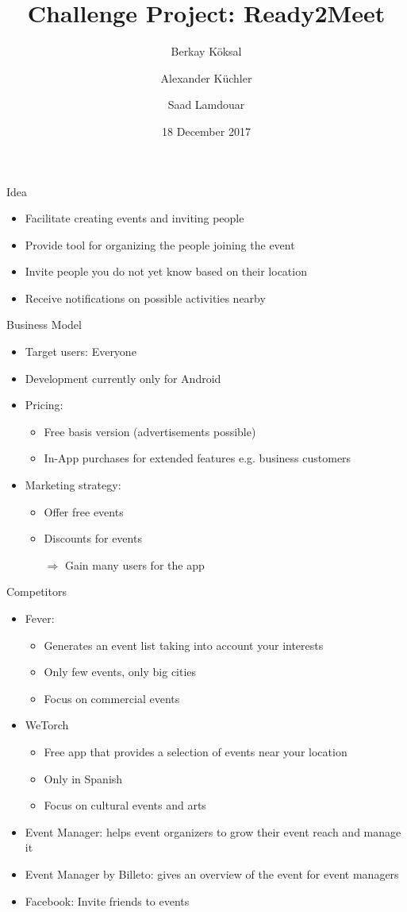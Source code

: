 \documentclass[logo=EURECOM,english]{eurecombeamer}
\date{18 December 2017}
\title{Challenge Project: Ready2Meet}
\author{Berkay K\"oksal \and Alexander K\"uchler \and Saad Lamdouar}
\institute{\EURECOMname}
\begin{document}
\maketitleframeEURECOM

\begin{frame}{Idea}
\begin{itemize}
\item Facilitate creating events and inviting people
\item Provide tool for organizing the people joining the event
\item Invite people you do not yet know based on their location
\item Receive notifications on possible activities nearby
\end{itemize}
\end{frame}

\begin{frame}{Business Model}
\begin{itemize}
\item Target users: Everyone
\item Development currently only for Android
\item Pricing:
	\begin{itemize}
	\item Free basis version (advertisements possible)
	\item In-App purchases for extended features e.g. business customers
	\end{itemize}
\item Marketing strategy:
	\begin{itemize}
	\item Offer free events
	\item Discounts for events
	\item[$\Rightarrow$] Gain many users for the app
	\end{itemize}
\end{itemize}
\end{frame}

\begin{frame}{Competitors}
\begin{itemize}
\item Fever:
	\begin{itemize}
	\item Generates an event list taking into account your interests
	\item Only few events, only big cities
	\item Focus on commercial events
	\end{itemize}
\item WeTorch
	\begin{itemize}
	\item Free app that provides a selection of events near your location
	\item Only in Spanish
	\item Focus on cultural events and arts
	\end{itemize}
\item Event Manager: helps event organizers to grow their event reach and manage it
\item Event Manager by Billeto: gives an overview of the event for event managers
\item Facebook: Invite friends to events
\end{itemize}
\end{frame}
\end{document}
